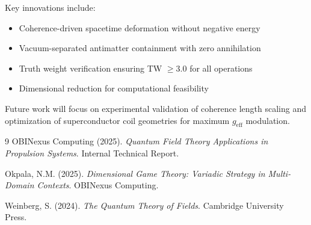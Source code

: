 \documentclass{article}
\begin{document}
Key innovations include:
\begin{itemize}
    \item Coherence-driven spacetime deformation without negative energy
    \item Vacuum-separated antimatter containment with zero annihilation
    \item Truth weight verification ensuring TW $\geq 3.0$ for all operations
    \item Dimensional reduction for computational feasibility
\end{itemize}

Future work will focus on experimental validation of coherence length scaling and optimization of superconductor coil geometries for maximum $g_{\text{eff}}$ modulation.

\begin{thebibliography}{9}
OBINexus Computing (2025). \textit{Quantum Field Theory Applications in Propulsion Systems}. Internal Technical Report.

Okpala, N.M. (2025). \textit{Dimensional Game Theory: Variadic Strategy in Multi-Domain Contexts}. OBINexus Computing.

Weinberg, S. (2024). \textit{The Quantum Theory of Fields}. Cambridge University Press.
\end{thebibliography}
\end{document}

